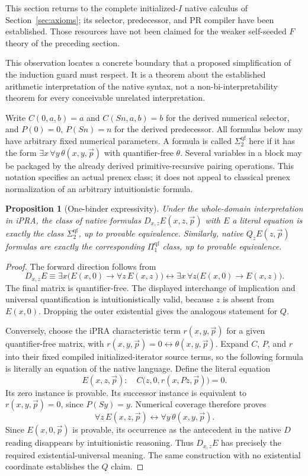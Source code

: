 \documentclass[11pt]{article}
\newtheorem{proposition}[theorem]{Proposition}
\theoremstyle{definition}\newtheorem{definition}[theorem]{Definition}
\begin{document}
This section returns to the complete initialized-$I$ native calculus of
Section~\ref{sec:axioms}; its selector, predecessor, and PR compiler have
been established. Those resources have not been claimed for the weaker
self-seeded $F$ theory of the preceding section.

This observation locates a concrete boundary that a proposed simplification
of the induction guard must respect. It is a theorem about the established
arithmetic interpretation of the native syntax, not a non-bi-interpretability
theorem for every conceivable unrelated interpretation.

Write $C(0,a,b)=a$ and $C(Sn,a,b)=b$ for the derived numerical selector,
and $P(0)=0$, $P(Sn)=n$ for the derived predecessor. All formulas below may
have arbitrary fixed numerical parameters. A formula is called
$\Sigma_2^{\mathrm{qf}}$ here if it has the form
$\exists x\,\forall y\,\theta(x,y,\vec p)$ with quantifier-free $\theta$.
Several variables in a block may be packaged by the already derived
primitive-recursive pairing operations. This notation specifies an actual
prenex class; it does not appeal to classical prenex normalization of an
arbitrary intuitionistic formula.

\begin{proposition}[One-binder expressivity]
Under the whole-domain interpretation in iPRA, the class of native formulas
$D_{x,z}E(x,z,\vec p)$ with $E$ a literal equation is exactly the class
$\Sigma_2^{\mathrm{qf}}$, up to provable equivalence. Similarly, native
$Q_zE(z,\vec p)$ formulas are exactly the corresponding
$\Pi_1^{\mathrm{qf}}$ class, up to provable equivalence.
\end{proposition}

\begin{proof}
The forward direction follows from
\[
 D_{x,z}E\equiv
 \exists x\bigl(E(x,0)\to\forall z\,E(x,z)\bigr)
 \leftrightarrow
 \exists x\,\forall z\bigl(E(x,0)\to E(x,z)\bigr).
\]
The final matrix is quantifier-free. The displayed interchange of
implication and universal quantification is intuitionistically valid,
because $z$ is absent from $E(x,0)$. Dropping the outer existential gives
the analogous statement for $Q$.

Conversely, choose the iPRA characteristic term $r(x,y,\vec p)$ for a
given quantifier-free matrix, with
$r(x,y,\vec p)=0\leftrightarrow\theta(x,y,\vec p)$. Expand $C$, $P$, and $r$
into their fixed compiled initialized-iterator source terms, so the following
formula is literally an equation of the native language. Define the literal
equation
\[
 E(x,z,\vec p):\quad
 C\bigl(z,0,r(x,Pz,\vec p)\bigr)=0.
\]
Its zero instance is provable. Its successor instance is equivalent to
$r(x,y,\vec p)=0$, since $P(Sy)=y$. Numerical coverage therefore proves
\[
 \forall z\,E(x,z,\vec p)
 \leftrightarrow \forall y\,\theta(x,y,\vec p).
\]
Since $E(x,0,\vec p)$ is provable, its occurrence as the antecedent in
the native $D$ reading disappears by intuitionistic reasoning. Thus
$D_{x,z}E$ has precisely the required existential-universal meaning.
The same construction with no existential coordinate establishes the
$Q$ claim.
\end{proof}
\end{document}
